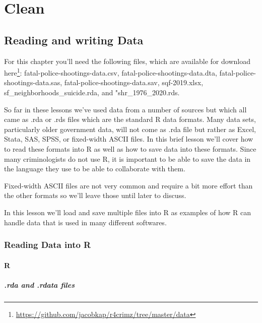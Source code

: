 \documentclass[
]{krantz}
\renewcommand{\href}[2]{#2\footnote{\url{#1}}}
\begin{document}
\hypertarget{part-clean}{%
\part{Clean}\label{part-clean}}

\hypertarget{reading-and-writing-data}{%
\chapter{Reading and writing Data}\label{reading-and-writing-data}}

For this chapter you'll need the following files, which are available for download \href{https://github.com/jacobkap/r4crimz/tree/master/data}{here}: fatal-police-shootings-data.csv, fatal-police-shootings-data.dta, fatal-police-shootings-data.sas, fatal-police-shootings-data.sav, sqf-2019.xlsx, sf\_neighborhoods\_suicide.rda, and "shr\_1976\_2020.rds.

So far in these lessons we've used data from a number of sources but which all came as .rda or .rds files which are the standard R data formats. Many data sets, particularly older government data, will not come as .rda file but rather as Excel, Stata, SAS, SPSS, or fixed-width ASCII files. In this brief lesson we'll cover how to read these formats into R as well as how to save data into these formats. Since many criminologists do not use R, it is important to be able to save the data in the language they use to be able to collaborate with them.

Fixed-width ASCII files are not very common and require a bit more effort than the other formats so we'll leave those until later to discuss.

In this lesson we'll load and save multiple files into R as examples of how R can handle data that is used in many different softwares.

\hypertarget{reading-data-into-r-1}{%
\section{Reading Data into R}\label{reading-data-into-r-1}}

\hypertarget{r}{%
\subsection{R}\label{r}}

\hypertarget{rda-and-.rdata-files}{%
\subsubsection{.rda and .rdata files}\label{rda-and-.rdata-files}}
\end{document}
